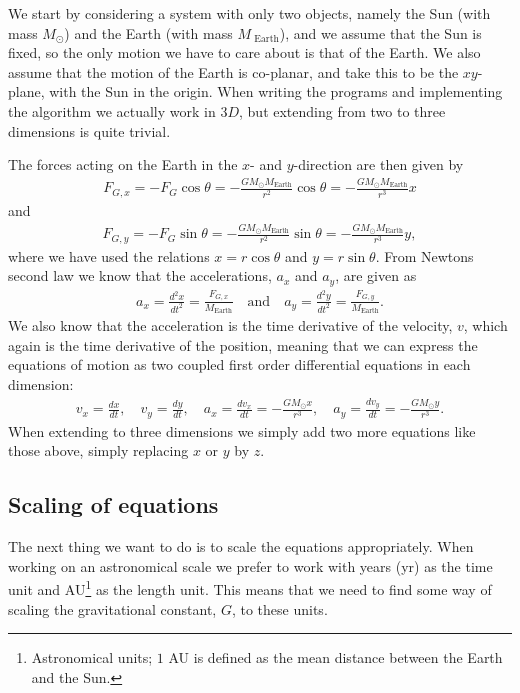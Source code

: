 \documentclass[12pt, a4paper]{article}
\begin{document}
We start by considering a system with only two objects, namely the Sun (with mass $M_{\odot}$) and the 
Earth (with mass $M_{\text{ Earth}}$), and we assume that the Sun is fixed, so the only motion we have to
care about is that of the Earth. We also assume that the motion of the Earth is co-planar, and take this 
to be the $xy$-plane, with the Sun in the origin. When writing the programs and implementing the 
algorithm we actually work in $3D$, but extending from two to three dimensions is quite trivial.  

The forces acting on the Earth in the $x$- and $y$-direction are then given by 
\begin{align*}
F_{G,x} = - F_G \cos\theta  = - \frac{GM_{\odot} M_{\text{Earth}}}{r^2}\cos\theta 
							= - \frac{GM_{\odot} M_{\text{Earth}}}{r^3}x 
\end{align*} 
and 
\begin{align*}
F_{G,y} = - F_G \sin\theta  = - \frac{GM_{\odot} M_{\text{Earth}}}{r^2}\sin\theta 
							= - \frac{GM_{\odot} M_{\text{Earth}}}{r^3}y,  
\end{align*}
where we have used the relations $x = r\cos\theta$ and $y = r\sin\theta$. From Newtons second law we know 
that the accelerations, $a_x$ and $a_y$, are given as 
\begin{align*}
a_x = \frac{d^2x}{dt^2} = \frac{F_{G,x}}{M_{\text{Earth}}} \quad \text{and} \quad 
a_y = \frac{d^2y}{dt^2} = \frac{F_{G,y}}{M_{\text{Earth}}}. 
\end{align*} 
We also know that the acceleration is the time derivative of the velocity, $v$, which again is 
the time derivative of the position, meaning that we can express the equations of motion as two 
coupled first order differential equations in each dimension:  
\begin{align}
v_x = \frac{dx}{dt}, \quad v_y = \frac{dy}{dt}, \quad 
a_x = \frac{dv_x}{dt} = -\frac{GM_{\odot}x}{r^3}, \quad a_y = \frac{dv_y}{dt} = -\frac{GM_{\odot}y}{r^3}.   
\label{eq:diff_eqs}
\end{align}
When extending to three dimensions we simply add two more equations like those above, simply 
replacing $x$ or $y$ by $z$. 

\subsection{Scaling of equations}

The next thing we want to do is to scale the equations appropriately. When working on an astronomical 
scale we prefer to work with years (yr) as the time unit and AU\footnote{Astronomical units; $1$ AU is
defined as the mean distance between the Earth and the Sun.} as the length unit. This means that we 
need to find some way of scaling the gravitational constant, $G$, to these units. 
\end{document}
